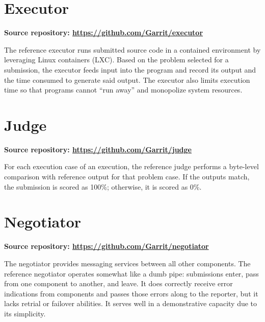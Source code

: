 \documentclass[11pt,letterpaper]{article}
\begin{document}
\section{Executor}
\label{executor}

\textbf{Source repository: \url{https://github.com/Garrit/executor}}

The reference executor runs submitted source code in a contained environment by
leveraging Linux containers (LXC). Based on the problem selected for a
submission, the executor feeds input into the program and record its output and
the time consumed to generate said output. The executor also limits execution
time so that programs cannot ``run away'' and monopolize system resources.

\section{Judge}
\label{judge}

\textbf{Source repository: \url{https://github.com/Garrit/judge}}

For each execution case of an execution, the reference judge performs a
byte-level comparison with reference output for that problem case. If the
outputs match, the submission is scored as 100\%; otherwise, it is scored as
0\%.

\section{Negotiator}
\label{negotiator}

\textbf{Source repository: \url{https://github.com/Garrit/negotiator}}

The negotiator provides messaging services between all other components. The
reference negotiator operates somewhat like a dumb pipe: submissions enter,
pass from one component to another, and leave. It does correctly receive error
indications from components and passes those errors along to the reporter, but
it lacks retrial or failover abilities. It serves well in a demonstrative
capacity due to its simplicity.
\end{document}
